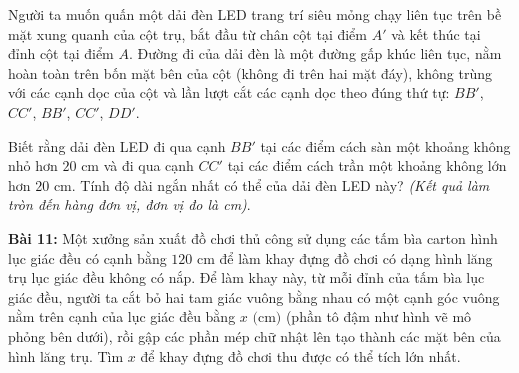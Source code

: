 \documentclass[12pt]{article}
\begin{document}
\begin{center}
	\end{center}
	
	Người ta muốn quấn một dải đèn LED trang trí siêu mỏng chạy liên tục trên bề mặt xung quanh của cột trụ, bắt đầu từ chân cột tại điểm $A'$ và kết thúc tại đỉnh cột tại điểm $A$. Đường đi của dải đèn là một đường gấp khúc liên tục, nằm hoàn toàn trên bốn mặt bên của cột (không đi trên hai mặt đáy), không trùng với các cạnh dọc của cột và lần lượt cắt các cạnh dọc theo đúng thứ tự: $BB'$, $CC'$, $BB'$, $CC'$, $DD'$. 
	
	Biết rằng dải đèn LED đi qua cạnh $BB'$ tại các điểm cách sàn một khoảng không nhỏ hơn $20\text{ cm}$ và đi qua cạnh $CC'$ tại các điểm cách trần một khoảng không lớn hơn $20\text{ cm}$. Tính độ dài ngắn nhất có thể của dải đèn LED này? \textit{(Kết quả làm tròn đến hàng đơn vị, đơn vị đo là cm)}.
	
	\vspace*{0.6cm}
	
	\noindent \textbf{Bài 11:} Một xưởng sản xuất đồ chơi thủ công sử dụng các tấm bìa carton hình lục giác đều có cạnh bằng $120\text{ cm}$ để làm khay đựng đồ chơi có dạng hình lăng trụ lục giác đều không có nắp. Để làm khay này, từ mỗi đỉnh của tấm bìa lục giác đều, người ta cắt bỏ hai tam giác vuông bằng nhau có một cạnh góc vuông nằm trên cạnh của lục giác đều bằng $x\text{ (cm)}$ (phần tô đậm như hình vẽ mô phỏng bên dưới), rồi gập các phần mép chữ nhật lên tạo thành các mặt bên của hình lăng trụ. Tìm $x$ để khay đựng đồ chơi thu được có thể tích lớn nhất.
	
\end{document}
